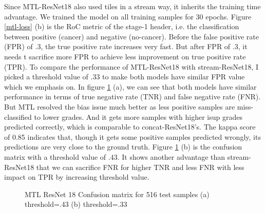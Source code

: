\documentclass[10pt,twocolumn,letterpaper]{article}
\begin{document}
Since MTL-ResNet18 also used tiles in a stream way, it inherits the training time advantage. We trained the model on all training samples for 30 epochs. Figure \ref{mtl-loss} (b) is the RoC metric of the stage-1 header, i.e. the classification between positive (cancer) and negative (no-cancer). Before the false positive rate (FPR) of $.3$, the true positive rate increases very fast. But after FPR of $.3$, it needs t sacrifice more FPR to achieve less improvement on true positive rate (TPR). To compare the performance of MTL-ResNet18 with stream-ResNet18, I picked a threshold value of $.33$ to make both models have similar FPR value which we emphasis on. In figure \ref{mtl-heatmap2} (a), we can see that both models have similar performance in terms of true negative rate (TNR) and false negative rate (FNR). But MTL resolved the bias issue much better as less positive samples are miss-classified to lower grades. And it gets more samples with higher isup grades predicted correctly, which is comparable to concat-ResNet18's. The kappa score of 0.85 indicates that, though it gets some positive samples predicted wrongly, its predictions are very close to the ground truth. Figure \ref{mtl-heatmap2} (b) is the confusion matrix with a threshold value of $.43$. It shows another advantage than stream-ResNet18 that we can sacrifice FNR for higher TNR and less FNR with less impact on TPR by increasing threshold value.


\begin{figure}[t]
\begin{center}
\end{center}
   \caption{MTL ResNet 18 Confusion matrix for 516 test samples (a) threshold=.43 (b) threshold=.33 }
\label{mtl-heatmap2}
\end{figure}


\end{document}
